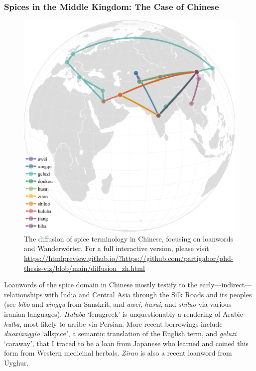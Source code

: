 \subsubsection{Spices in the Middle Kingdom: The Case of Chinese }

\begin{figure}[ht!]
  \includegraphics[width=\linewidth]{imgs/plots/diffusion_zh.pdf}
  \caption[The diffusion of spice terminology in Chinese.]{The diffusion of spice terminology in Chinese, focusing on loanwords and Wanderwörter. For a full interactive version, please visit \url{https://htmlpreview.github.io/?https://github.com/partigabor/phd-thesis-viz/blob/main/diffusion_zh.html}}
  \label{fig:diffusion_zh}
\end{figure}

Loanwords of the spice domain in Chinese mostly testify to the early---indirect---relationships with India and Central Asia through the Silk Roads and its peoples (see \textit{bibo} and \textit{xingqu} from Sanskrit, and \textit{awei}, \textit{husui}, and \textit{shiluo} via various iranian languages). \textit{Huluba} `fenugreek' is unquestionably a rendering of Arabic \textit{hulba}, most likely to arribe via Persian. More recent borrowings include \textit{duoxianggio} `allspice', a semantic translation of the English term, and \textit{geluzi} `caraway', that I traced to be a loan from Japanese who learned and coined this form from Western medicinal herbals. \textit{Ziran} is also a recent loanword from Uyghur.

